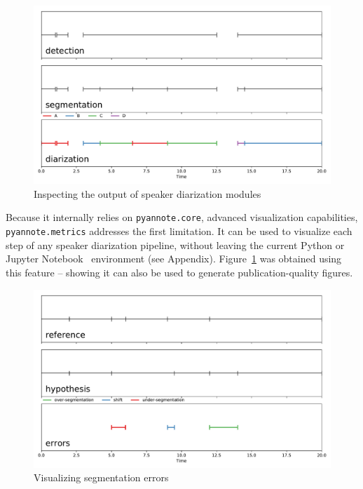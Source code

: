 \documentclass[a4paper]{article}
\newcommand*\metrics{\texttt{\footnotesize{pyannote.metrics}}}
\newcommand*\core{\texttt{\footnotesize{pyannote.core}}}
\begin{document}
\begin{figure}[htb]
  \centering
  \includegraphics[width=\linewidth]{figures/visualization.pdf}
  \caption{Inspecting the output of speaker diarization modules}
  \label{fig:visualization}
\end{figure}

Because it internally relies on \core{}, advanced visualization capabilities, \metrics{} addresses the first limitation. It can be used to visualize each step of any speaker diarization pipeline, without leaving the current Python or Jupyter Notebook~\cite{jupyter} environment (see Appendix).
Figure~\ref{fig:visualization} was obtained using this feature -- showing it can also be used to generate publication-quality figures.

\begin{figure}[htb]
  \centering
  \includegraphics[width=\linewidth]{figures/segmentation_error.pdf}
  \caption{Visualizing segmentation errors}
  \label{fig:segmentation_errors}
\end{figure}
\end{document}

